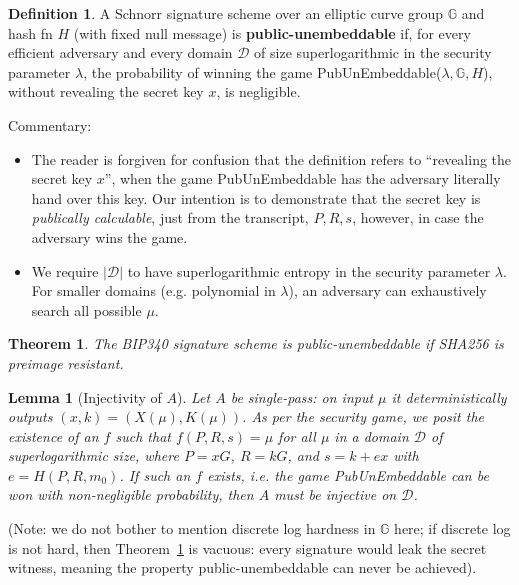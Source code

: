 \documentclass[10pt,a4paper]{article}
\newtheorem{theorem}{Theorem}
\newtheorem{lemma}{Lemma}       %
\theoremstyle{definition}   %
\newtheorem{definition}{Definition}
\theoremstyle{remark}       %
\newcommand{\G}{\mathbb{G}}
\begin{document}
\begin{definition}
A Schnorr signature scheme over an elliptic curve group $\G$ and hash fn $H$ (with fixed null message) is \textbf{public-unembeddable} if, for every efficient adversary and every domain $\mathcal{D}$ of size superlogarithmic in the security parameter $\lambda$, the probability of winning the game PubUnEmbeddable($\lambda, \G, H$), without revealing the secret key $x$, is negligible.
\end{definition}

Commentary:

\begin{itemize}
\item The reader is forgiven for confusion that the definition refers to ``revealing the secret key $x$'', when the game PubUnEmbeddable has the adversary literally hand over this key. Our intention is to demonstrate that the secret key is \emph{publically calculable}, just from the transcript, $P, R, s$, however, in case the adversary wins the game.
\item We require $|\mathcal{D}|$ to have superlogarithmic entropy in the security parameter $\lambda$. For smaller domains (e.g. polynomial in $\lambda$), an adversary can exhaustively search all possible $\mu$.
\end{itemize}

\begin{theorem}
\label{thm:pubunembedthm}
The BIP340 signature scheme is public-unembeddable if SHA256 is preimage resistant.
\end{theorem}


\begin{lemma}[Injectivity of $A$]
\label{lem:Xinjective}
Let $A$ be single-pass: on input $\mu$ it deterministically outputs
$(x,k) = (X(\mu),K(\mu))$. As per the security game, we posit the existence of an $f$ such that
$f(P,R,s)=\mu$ for all $\mu$ in a domain $\mathcal{D}$ of superlogarithmic size,
where $P=xG$, $R=kG$, and $s=k+ex$ with $e=H(P, R, m_0)$.
If such an $f$ exists, i.e. the game PubUnEmbeddable can be won with non-negligible probability, then $A$ must be injective on $\mathcal{D}$.
\end{lemma}

(Note: we do not bother to mention discrete log hardness in $\G$ here; if discrete log is not hard, then Theorem~\ref{thm:pubunembedthm} is vacuous: every signature would leak the secret witness, meaning the property public-unembeddable can never be achieved).
\end{document}
